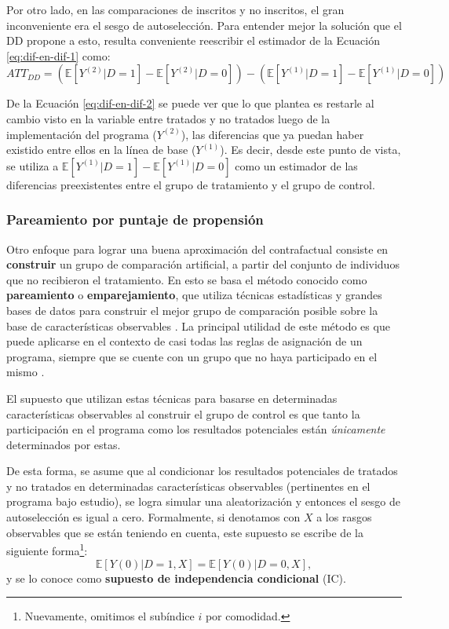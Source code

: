 \documentclass[../../main.tex]{subfiles}
\begin{document}
Por otro lado, en las comparaciones de inscritos y no inscritos, el gran inconveniente era
el sesgo de autoselección. Para entender mejor la solución que el DD propone a esto,
resulta conveniente reescribir el estimador de la Ecuación \ref{eq:dif-en-dif-1} como:
\begin{equation}
    ATT_{DD} =
        \left(
            \mathbb{E}\left[Y^{(2)}|D=1\right] - \mathbb{E}\left[Y^{(2)}|D=0\right]
        \right) -
        \left(
            \mathbb{E}\left[Y^{(1)}|D=1\right] - \mathbb{E}\left[Y^{(1)}|D=0\right]
        \right)
        \label{eq:dif-en-dif-2}
\end{equation}

De la Ecuación \ref{eq:dif-en-dif-2} se puede ver que lo que plantea es restarle al cambio
visto en la variable entre tratados y no tratados luego de la implementación del programa
(\(Y^{(2)}\)), las diferencias que ya puedan haber existido entre ellos en la línea de base
(\(Y^{(1)}\)). Es decir, desde este punto de vista, se utiliza a
\(\mathbb{E}\left[Y^{(1)}|D=1\right] - \mathbb{E}\left[Y^{(1)}|D=0\right]\) como un
estimador de las diferencias preexistentes entre el grupo de tratamiento y el grupo de
control.

\subsubsection{Pareamiento por puntaje de propensión}
Otro enfoque para lograr una buena aproximación del contrafactual consiste en
\textbf{construir} un grupo de comparación artificial, a partir del conjunto de individuos
que no recibieron el tratamiento. En esto se basa el método conocido como
\textbf{pareamiento} o \textbf{emparejamiento}, que utiliza técnicas estadísticas y
grandes bases de datos para construir el mejor grupo de comparación posible sobre la base
de características observables \cite{gertler-2016}. La principal utilidad de este método
es que puede aplicarse en el contexto de casi todas las reglas de asignación de un
programa, siempre que se cuente con un grupo que no haya participado en el mismo
\cite{gertler-2016}.

El supuesto que utilizan estas técnicas para basarse en determinadas características
observables al construir el grupo de control es que tanto la participación en el programa
como los resultados potenciales están \textit{únicamente} determinados por estas.

De esta forma, se asume que al condicionar los resultados potenciales de tratados y no
tratados en determinadas características observables (pertinentes en el programa bajo
estudio), se logra simular una aleatorización y entonces el sesgo de autoselección es
igual a cero. Formalmente, si denotamos con \(X\) a los rasgos observables que se están
teniendo en cuenta, este supuesto se escribe de la siguiente forma\footnote{Nuevamente,
omitimos el subíndice \(i\) por comodidad.}:
\begin{equation}
    \mathbb{E}\left[Y(0)|D=1, X\right] = \mathbb{E}\left[Y(0)|D=0, X\right],
\end{equation}
y se lo conoce como \textbf{supuesto de independencia condicional} (IC).
\end{document}
